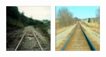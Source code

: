 \documentclass[12pt]{article}
\begin{document}
\begin{figure}[!htbp]
  \begin{minipage}[t]{0.2 \textwidth}
    \centering \includegraphics[width= \linewidth]{./figures/railroad}
    \centering \includegraphics[width= \linewidth]{./figures/railroad2}  

\end{minipage}
\end{figure}
\end{document}
